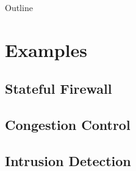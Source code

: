 \documentclass{beamer}
\begin{document}
\begin{frame}
    \titlepage
\end{frame}

\begin{frame}{Outline}
    \tableofcontents
\end{frame}


\section{Examples}

\subsection{Stateful Firewall}



\subsection{Congestion Control}



\subsection{Intrusion Detection}


\end{document}
